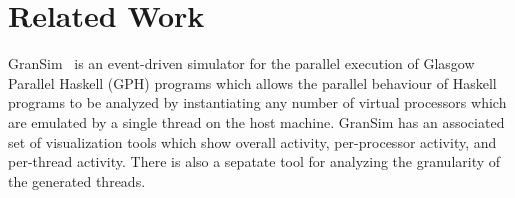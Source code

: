 
\section{Related Work}
GranSim~\cite{loidl} is an event-driven simulator for the parallel execution of Glasgow Parallel Haskell (GPH) programs which allows the parallel behaviour of Haskell programs to be analyzed by instantiating any number of virtual processors which are emulated by a single thread on the host machine. GranSim has an associated set of visualization tools which show overall activity, per-processor activity, and per-thread activity. There is also a sepatate tool for analyzing the granularity of the generated threads.